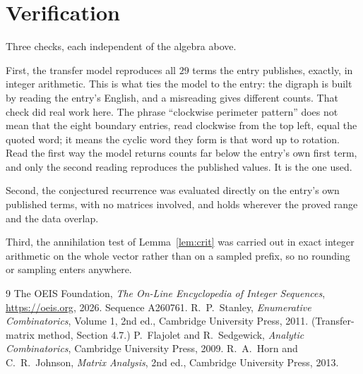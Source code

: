 \documentclass[11pt,a4paper]{article}
\theoremstyle{plain}
\theoremstyle{definition}
\begin{document}
\section{Verification}

Three checks, each independent of the algebra above.

First, the transfer model reproduces all $29$ terms the entry publishes, exactly, in
integer arithmetic. This is what ties the model to the entry: the digraph is built by reading
the entry's English, and a misreading gives different counts. That check did real work here. The phrase ``clockwise perimeter pattern'' does not mean that the eight boundary entries, read clockwise from the top left, equal the quoted word; it means the cyclic word they form is that word up to rotation. Read the first way the model returns counts far below the entry's own first term, and only the second reading reproduces the published values. It is the one used.

Second, the conjectured recurrence was evaluated directly on the entry's own published terms,
with no matrices involved, and holds wherever the proved range and the data overlap.

Third, the annihilation test of Lemma~\ref{lem:crit} was carried out in exact integer
arithmetic on the whole vector rather than on a sampled prefix, so no rounding or sampling
enters anywhere.

\begin{thebibliography}{9}
 The OEIS Foundation, \emph{The On-Line Encyclopedia of Integer
Sequences}, \url{https://oeis.org}, 2026. Sequence A260761.
 R.~P.~Stanley, \emph{Enumerative Combinatorics}, Volume 1, 2nd ed.,
Cambridge University Press, 2011. (Transfer-matrix method, Section 4.7.)
 P.~Flajolet and R.~Sedgewick, \emph{Analytic Combinatorics}, Cambridge
University Press, 2009.
 R.~A.~Horn and C.~R.~Johnson, \emph{Matrix Analysis}, 2nd ed., Cambridge
University Press, 2013.
\end{thebibliography}
\end{document}
